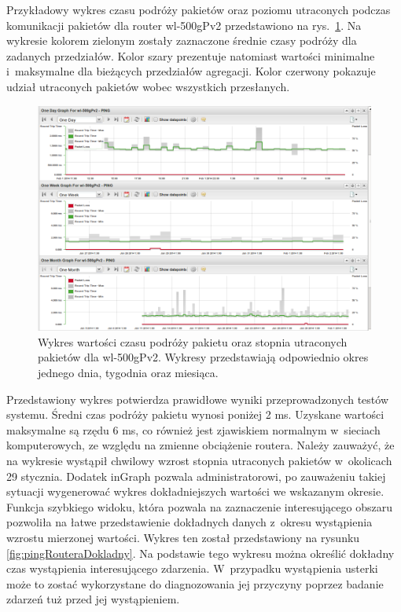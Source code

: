 Przykładowy wykres czasu podróży pakietów oraz poziomu utraconych
podczas komunikacji pakietów dla router wl-500gPv2 przedstawiono na
rys.~\ref{fig:pingRoutera}. Na wykresie kolorem zielonym zostały
zaznaczone średnie czasy podróży dla zadanych przedziałów. Kolor szary
prezentuje natomiast wartości minimalne i~maksymalne dla bieżących
przedziałów agregacji. Kolor czerwony pokazuje udział utraconych
pakietów wobec wszystkich przesłanych.

\begin{figure}[ht]
  \caption{Wykres wartości czasu podróży pakietu oraz stopnia
    utraconych pakietów dla wl-500gPv2. Wykresy przedstawiają
    odpowiednio okres jednego dnia, tygodnia oraz miesiąca.}
  \label{fig:pingRoutera}
  \centering
\includegraphics[width=1\textwidth]{img/pingRoutera.png}
\end{figure}

Przedstawiony wykres potwierdza prawidłowe wyniki przeprowadzonych
testów systemu. Średni czas podróży pakietu wynosi poniżej 2
ms. Uzyskane wartości maksymalne są rzędu 6 ms, co również jest
zjawiskiem normalnym w~sieciach komputerowych, ze względu na zmienne
obciążenie routera. Należy zauważyć, że na wykresie wystąpił chwilowy
wzrost stopnia utraconych pakietów w~okolicach 29 stycznia. Dodatek
inGraph pozwala administratorowi, po zauważeniu takiej sytuacji
wygenerować wykres dokładniejszych wartości we wskazanym
okresie. Funkcja szybkiego widoku, która pozwala na zaznaczenie
interesującego obszaru pozwoliła na łatwe przedstawienie dokładnych
danych z~okresu wystąpienia wzrostu mierzonej wartości. Wykres ten
został przedstawiony na rysunku \ref{fig:pingRouteraDokladny}. Na
podstawie tego wykresu można określić dokładny czas wystąpienia
interesującego zdarzenia. W~przypadku wystąpienia usterki może to
zostać wykorzystane do diagnozowania jej przyczyny poprzez badanie
zdarzeń tuż przed jej wystąpieniem.

